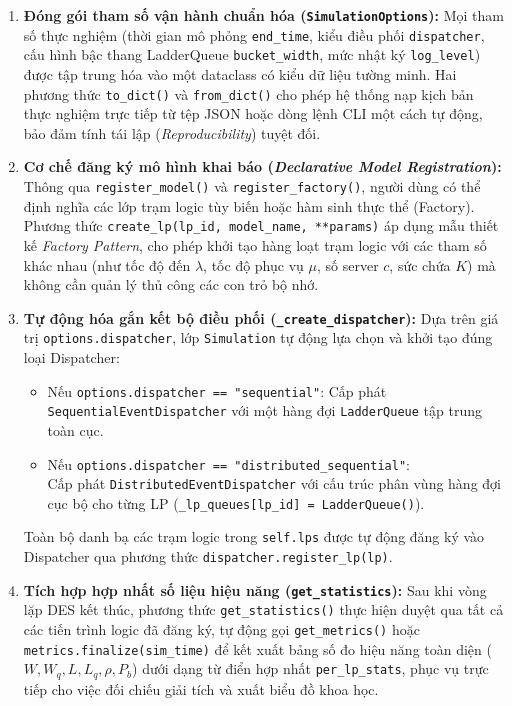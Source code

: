\begin{enumerate}[leftmargin=1.8em, itemsep=3pt]
\item \textbf{Đóng gói tham số vận hành chuẩn hóa (\texttt{SimulationOptions}):}
Mọi tham số thực nghiệm (thời gian mô phỏng \texttt{end\_time}, kiểu điều phối \texttt{dispatcher}, cấu hình bậc thang LadderQueue \texttt{bucket\_width}, mức nhật ký \texttt{log\_level}) được tập trung hóa vào một dataclass có kiểu dữ liệu tường minh. Hai phương thức \texttt{to\_dict()} và \texttt{from\_dict()} cho phép hệ thống nạp kịch bản thực nghiệm trực tiếp từ tệp JSON hoặc dòng lệnh CLI một cách tự động, bảo đảm tính tái lập (\textit{Reproducibility}) tuyệt đối.

\item \textbf{Cơ chế đăng ký mô hình khai báo (\textit{Declarative Model Registration}):}
Thông qua \texttt{register\_model()} và \texttt{register\_factory()}, người dùng có thể định nghĩa các lớp trạm logic tùy biến hoặc hàm sinh thực thể (Factory). Phương thức \texttt{create\_lp(lp\_id, model\_name, **params)} áp dụng mẫu thiết kế \textit{Factory Pattern}, cho phép khởi tạo hàng loạt trạm logic với các tham số khác nhau (như tốc độ đến $\lambda$, tốc độ phục vụ $\mu$, số server $c$, sức chứa $K$) mà không cần quản lý thủ công các con trỏ bộ nhớ.

\item \textbf{Tự động hóa gắn kết bộ điều phối (\texttt{\_create\_dispatcher}):}
Dựa trên giá trị \texttt{options.dispatcher}, lớp \texttt{Simulation} tự động lựa chọn và khởi tạo đúng loại Dispatcher:
\begin{itemize}[leftmargin=1.2em, itemsep=1pt]
\item Nếu \texttt{options.dispatcher == "sequential"}: Cấp phát \texttt{SequentialEventDispatcher} với một hàng đợi \texttt{LadderQueue} tập trung toàn cục.
\item Nếu \texttt{options.dispatcher == "distributed\_sequential"}:\\ Cấp phát \texttt{DistributedEventDispatcher} với cấu trúc phân vùng hàng đợi cục bộ cho từng LP (\texttt{\_lp\_queues[lp\_id] = LadderQueue()}).
\end{itemize}
Toàn bộ danh bạ các trạm logic trong \texttt{self.lps} được tự động đăng ký vào Dispatcher qua phương thức \texttt{dispatcher.register\_lp(lp)}.

\item \textbf{Tích hợp hợp nhất số liệu hiệu năng (\texttt{get\_statistics}):}
Sau khi vòng lặp DES kết thúc, phương thức \texttt{get\_statistics()} thực hiện duyệt qua tất cả các tiến trình logic đã đăng ký, tự động gọi \texttt{get\_metrics()} hoặc \texttt{metrics.finalize(sim\_time)} để kết xuất bảng số đo hiệu năng toàn diện ($W, W_q, L, L_q, \rho, P_b$) dưới dạng từ điển hợp nhất \texttt{per\_lp\_stats}, phục vụ trực tiếp cho việc đối chiếu giải tích và xuất biểu đồ khoa học.
\end{enumerate}


